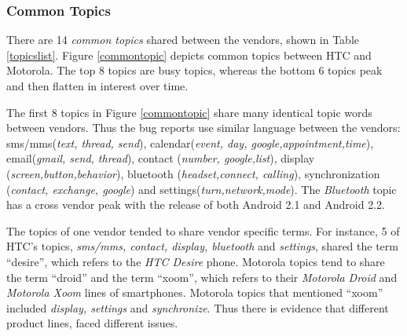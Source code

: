 \documentclass[10pt, conference, compsocconf]{IEEEtran}
\begin{document}
\subsubsection{Common Topics}

There are 14 \textit{common topics} shared between the vendors, shown
in Table \ref{topicslist}.
Figure \ref{commontopic} depicts common topics between HTC and
Motorola. The top 8 topics are busy topics, whereas the bottom 6
topics peak and then flatten in interest over time.

The first 8 topics in Figure \ref{commontopic} share many identical
topic words between vendors.
Thus the bug reports use similar language between the vendors:
sms\//mms(\textit{text, thread, send}), calendar(\textit{event, day,
  google,appointment,time}), email(\textit{gmail, send, thread}),
contact (\textit{number, google,list}), display
(\textit{screen,button,behavior}), bluetooth (\textit{headset,connect,
  calling}), synchronization (\textit{contact, exchange, google}) and
settings(\textit{turn,network,mode}).
The \textit{Bluetooth} topic has a cross vendor peak 
with the release of both
 Android 2.1 and Android
2.2. 

The topics of one vendor tended to share vendor specific terms.
For instance, 5 of HTC's topics, \textit{sms\//mms, contact,
  display, bluetooth} and \textit{settings}, shared the term
``desire'', which refers to the \textit{HTC Desire} phone.
Motorola topics tend to share the term ``droid'' and the term ``xoom'', which refers to their
\textit{Motorola Droid} and \textit{Motorola Xoom} lines of smartphones.
Motorola topics that mentioned ``xoom'' included \textit{display,
  settings} and \textit{synchronize}.
Thus there is evidence that different product lines, faced different issues.
\end{document}
